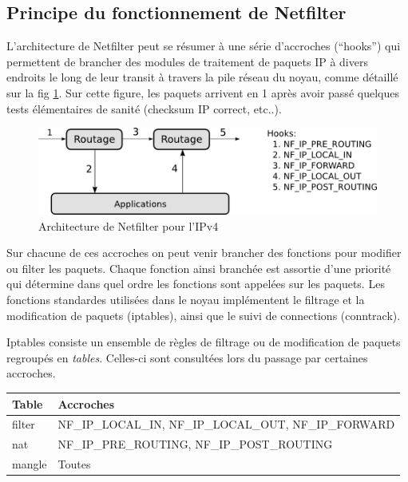 \subsection{Principe du fonctionnement de Netfilter}


L'architecture de Netfilter peut se résumer à une série d'accroches
(``hooks'') qui permettent de brancher des modules de traitement de
paquets IP à divers endroits le long de leur transit à travers la pile
réseau du noyau, comme détaillé sur la fig \ref{NF}. Sur cette figure,
les paquets arrivent en 1 après avoir passé quelques tests
élémentaires de sanité (checksum IP correct, etc..).

\begin{figure}
  \begin{center}
    \includegraphics{report/netfilter.png}
    \caption{Architecture de Netfilter pour l'IPv4}
    \label{NF}
  \end{center}
\end{figure}

Sur chacune de ces accroches on peut venir brancher des fonctions pour
modifier ou filter les paquets. Chaque fonction ainsi branchée est
assortie d'une priorité qui détermine dans quel ordre les fonctions
sont appelées sur les paquets. Les fonctions standardes utilisées dans
le noyau implémentent le filtrage et la modification de paquets
(iptables), ainsi que le suivi de connections (conntrack).

Iptables consiste un ensemble de règles de filtrage ou de modification
de paquets regroupés en \textit{tables}. Celles-ci sont consultées
lors du passage par certaines accroches.

\begin{center}
  \begin{tabular}{|l|l|}
    \hline
    \textbf{Table} & \textbf{Accroches} \\
    \hline
    filter & NF\_IP\_LOCAL\_IN, NF\_IP\_LOCAL\_OUT, NF\_IP\_FORWARD \\
    \hline
    nat & NF\_IP\_PRE\_ROUTING, NF\_IP\_POST\_ROUTING \\
    \hline
    mangle & Toutes \\
    \hline
  \end{tabular}
\end{center}

